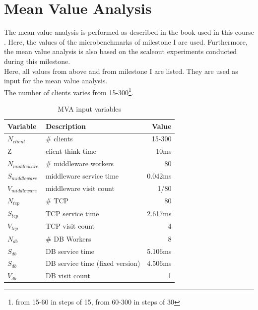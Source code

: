 \documentclass[a4paper]{article}
\begin{document}
\pagebreak

\section{Mean Value Analysis}

The mean value analysis is performed as described in the book used in this course \cite[Box 34.3, Box 35.1, Box 36.1]{Raj}. Here, the values of the microbenchmarks of milestone I\cite{milestone1} are used. Furthermore, the mean value analysis is also based on the scaleout experiments conducted during this milestone.\\



Here, all values from above and from milestone I\cite{milestone1} are listed. They are used as input for the mean value analysis.\\

The number of clients varies from 15-300\footnote{from 15-60 in steps of 15, from 60-300 in steps of 30}.\\

\begin{table}[h!]
\begin{center}
\begin{tabular}{|l|l|r|}
\hline
\textbf{Variable} & \textbf{Description} & \textbf{Value} \\ \hline
$N_{client}$ & \# clients & 15-300 \\ \hline
Z & client think time & 10ms \\ \hline
$N_{middleware}$ & \# middleware workers & 80 \\ \hline
$S_{middleware}$ & middleware service time & 0.042ms \\ \hline
$V_{middleware}$ & middleware visit count & 1/80 \\ \hline
$N_{tcp}$ & \# TCP & 80 \\ \hline
$S_{tcp}$ & TCP service time & 2.617ms \\ \hline
$V_{tcp}$ & TCP visit count & 4 \\ \hline
$N_{db}$ & \# DB Workers & 8 \\ \hline
$S_{db}$ & DB service time & 5.106ms \\ \hline
$S_{db}$ & DB service time (fixed version) & 4.506ms \\ \hline
$V_{db}$ & DB visit count & 1 \\ \hline
\end{tabular}
\caption{MVA input variables}
\end{center}
\end{table}
\end{document}
